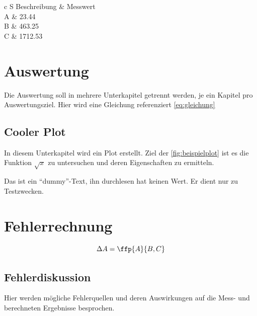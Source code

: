 \documentclass[
    a4paper, %
	ngerman, %
    12pt, %
	parskip=half, %
    oneside, %
	DIV=calc, %
]{scrartcl}
\begin{document}
\begin{table}[H]
	\centering
	\caption{
		Dies ist eine Beispieltabelle für die Messwert Sektion.
		Es empfiehlt sich alle Tabellen ungefähr im gleichem Stil zu bewahren.
		Der Tabellentyp S ist von \texttt{siunitx} und Formatiert die Nummern direkt richtig.
		Mit [table-number-alignment=left] hinter dem S, kann ausgesucht werden, wie die Nummern ausgerichtet werden.
		Zu sehen ist auch, dass die Nummer am Dezimaltrennzeichen ausgerichtet sind.
	}
	\begin{tabular}{c S}
		\toprule
		Beschreibung & {Messwert} \\
		A & 23.44 \\
		\midrule
		B & 463.25 \\
		\midrule
		C & 1712.53 \\
		\bottomrule
	\end{tabular}
	\label{tab:beispieltabelle}
\end{table}



\section{Auswertung}
Die Auswertung soll in mehrere Unterkapitel getrennt werden, je ein Kapitel pro Auswertungsziel.
Hier wird eine Gleichung referenziert \cref{eq:gleichung}

\subsection{Cooler Plot}
In diesem Unterkapitel wird ein Plot erstellt.
Ziel der \cref{fig:beispielplot} ist es die Funktion \(\sqrt{x}\) zu untersuchen und deren Eigenschaften zu ermitteln.



Das ist ein \enquote{dummy}-Text, ihn durchlesen hat keinen Wert.
Er dient nur zu Testzwecken.



\section[Fehlerrechnung]{Fehlerrechnung}
\begin{equation}
	\Delta A = \ffp{A}{B,C}
\end{equation}

\subsection{Fehlerdiskussion}
Hier werden mögliche Fehlerquellen und deren Auswirkungen auf die Mess- und berechneten Ergebnisse besprochen.
\end{document}
